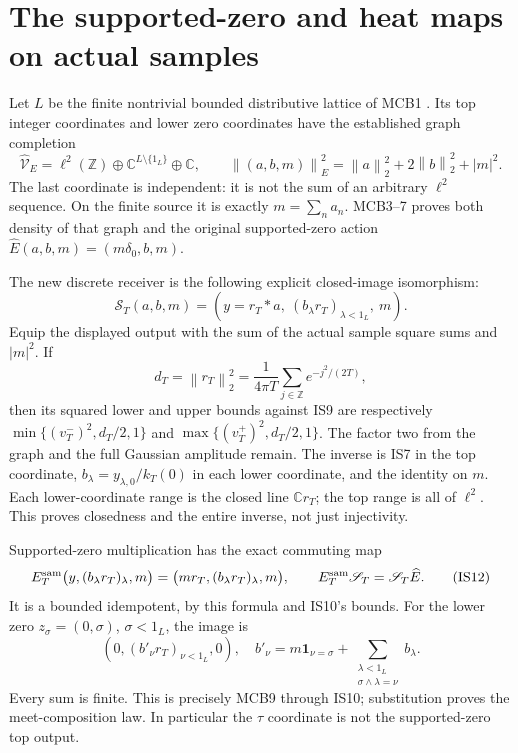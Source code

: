 \documentclass[11pt]{article}
\newcommand{\Z}{\mathbb Z}\newcommand{\C}{\mathbb C}\newcommand{\R}{\mathbb R}
\newcommand{\norm}[1]{\left\|#1\right\|}
\begin{document}
\section{The supported-zero and heat maps on actual samples}
Let $L$ be the finite nontrivial bounded distributive lattice of MCB1 \cite{MCB}. Its top integer coordinates and lower zero coordinates have the established graph completion
\begin{equation}
\widehat{\mathcal V}_E=\ell^2(\Z)\oplus\C^{L\setminus\{1_L\}}\oplus\C,
\qquad\norm{(a,b,m)}_E^2=\norm a_2^2+2\norm b_2^2+|m|^2. \tag{IS9}
\end{equation}
The last coordinate is independent: it is not the sum of an arbitrary $\ell^2$ sequence. On the finite source it is exactly $m=\sum_na_n$. MCB3--7 proves both density of that graph and the original supported-zero action
$\widehat E(a,b,m)=(m\delta_0,b,m)$.

The new discrete receiver is the following explicit closed-image isomorphism:
\begin{equation}
\mathscr S_T(a,b,m)=\left(y=r_T*a,\ (b_\lambda r_T)_{\lambda<1_L},\ m\right).
 \tag{IS10}
\end{equation}
Equip the displayed output with the sum of the actual sample square sums and $|m|^2$. If
\begin{equation}
d_T=\norm{r_T}_2^2=\frac1{4\pi T}\sum_{j\in\Z}e^{-j^2/(2T)}, \tag{IS11}
\end{equation}
then its squared lower and upper bounds against IS9 are respectively
$\min\{(v_T^-)^2,d_T/2,1\}$ and
$\max\{(v_T^+)^2,d_T/2,1\}$. The factor two from the graph and the full Gaussian amplitude remain. The inverse is IS7 in the top coordinate, $b_\lambda=y_{\lambda,0}/k_T(0)$ in each lower coordinate, and the identity on $m$. Each lower-coordinate range is the closed line $\C r_T$; the top range is all of $\ell^2$. This proves closedness and the entire inverse, not just injectivity.

Supported-zero multiplication has the exact commuting map
\begin{equation}
E_T^{\rm sam}\bigl(y,(b_\lambda r_T)_\lambda,m\bigr)
 =\bigl(mr_T,(b_\lambda r_T)_\lambda,m\bigr),\qquad
E_T^{\rm sam}\mathscr S_T=\mathscr S_T\widehat E. \tag{IS12}
\end{equation}
It is a bounded idempotent, by this formula and IS10's bounds. For the lower zero $z_\sigma=(0,\sigma)$, $\sigma<1_L$, the image is
\begin{equation}
\left(0,(b'_\nu r_T)_{\nu<1_L},0\right),\quad
b'_\nu=m\mathbf1_{\nu=\sigma}
 +\sum_{\substack{\lambda<1_L\\\sigma\wedge\lambda=\nu}}b_\lambda. \tag{IS13}
\end{equation}
Every sum is finite. This is precisely MCB9 through IS10; substitution proves the meet-composition law. In particular the $\tau$ coordinate is not the supported-zero top output.
\end{document}
